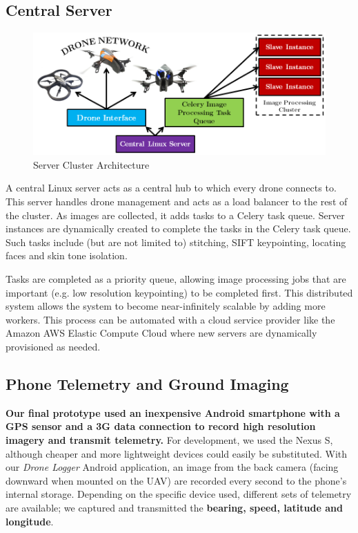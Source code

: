 \subsection{Central Server}

\begin{figure}[h!]
		\caption{Server Cluster Architecture}
		\label{fig:ServerArch}
		\centering \includegraphics[width=0.9\linewidth]{illustrations/serverarch_lmroman}
\end{figure}

\noindent
A central Linux server acts as a central hub to which every drone connects to. This server handles drone management and acts as a load balancer to the rest of the cluster. As images are collected, it adds tasks to a Celery task queue. Server instances are dynamically created to complete the tasks in the Celery task queue. Such tasks include (but are not limited to) stitching, SIFT keypointing, locating faces and skin tone isolation.

Tasks are completed as a priority queue, allowing image processing jobs that are important (e.g. low resolution keypointing) to be completed first. This distributed system allows the system to become near-infinitely scalable by adding more workers. This process can be automated with a cloud service provider like the Amazon AWS Elastic Compute Cloud where new servers are dynamically provisioned as needed.



\subsection{Phone Telemetry and Ground Imaging}
\textbf{Our final prototype used an inexpensive Android smartphone with a GPS sensor and a 3G data connection to record high resolution imagery and transmit telemetry.} For development, we used the Nexus S, although cheaper and more lightweight devices could easily be substituted. With our \textit{Drone Logger} Android application, an image from the back camera (facing downward when mounted on the UAV) are recorded every second to the phone's internal storage. Depending on the specific device used, different sets of telemetry are available; we captured and transmitted the \textbf{bearing, speed, latitude and longitude}.

